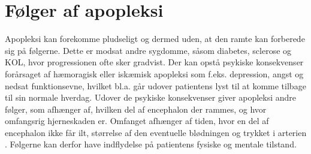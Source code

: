 \section{Følger af apopleksi }
Apopleksi kan forekomme pludseligt og dermed uden, at den ramte kan forberede sig på følgerne. Dette er modsat andre sygdomme, såsom diabetes, sclerose og KOL, hvor progressionen ofte sker gradvist. Der kan opstå psykiske konsekvenser forårsaget af hæmoragisk eller iskæmisk apopleksi som f.eks. depression, angst og nedsat funktionsevne, hvilket bl.a. går udover patientens lyst til at komme tilbage til sin normale hverdag. \cite{Muus2008} Udover de psykiske konsekvenser giver apopleksi andre følger, som afhænger af, hvilken del af encephalon der rammes, og hvor omfangsrig hjerneskaden er. Omfanget afhænger af tiden, hvor en del af encephalon ikke får ilt, størrelse af den eventuelle blødningen og trykket i arterien \cite{Michael-Titus2010}. Følgerne kan derfor have indflydelse på patientens fysiske og mentale tilstand. \\


